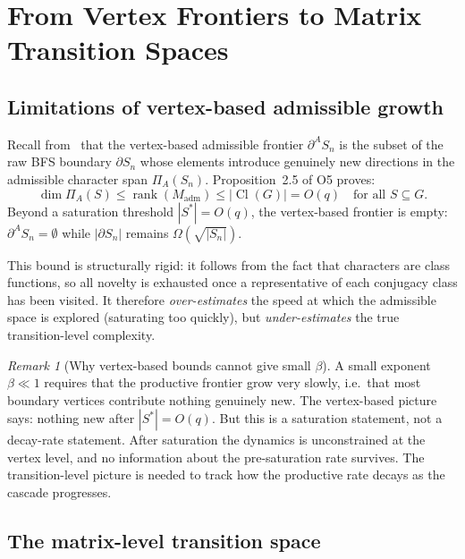 \documentclass[11pt]{article}
\theoremstyle{definition}
\theoremstyle{remark}
\newtheorem{remark}[theorem]{Remark}
\DeclareMathOperator{\rank}{rank}
\DeclareMathOperator{\Cl}{Cl}
\begin{document}
  \section{From Vertex Frontiers to Matrix Transition Spaces}
  \label{sec:matspace}

  \subsection{Limitations of vertex-based admissible growth}
    \label{ssec:vertex-limits}

    Recall from~\cite{Beau2026a9} that the vertex-based admissible frontier
    $\partial^A S_n$ is the subset of the raw BFS boundary $\partial S_n$ whose elements
    introduce genuinely new directions in the admissible character span $\Pi_A(S_n)$.
    Proposition~2.5 of O5 proves:
    \begin{equation}
      \label{eq:O5-saturation}
      \dim \Pi_A(S) \leq \rank(M_{\mathrm{adm}}) \leq |\Cl(G)| = O(q)
      \quad \text{for all } S \subseteq G.
    \end{equation}
    Beyond a saturation threshold $|S^*| = O(q)$, the vertex-based frontier is empty:
    $\partial^A S_n = \emptyset$ while $|\partial S_n|$ remains $\Omega(\sqrt{|S_n|})$.

    This bound is structurally rigid: it follows from the fact that characters are class
    functions, so all novelty is exhausted once a representative of each conjugacy class
    has been visited.
    It therefore \emph{over-estimates} the speed at which the admissible space is
    explored (saturating too quickly), but \emph{under-estimates} the true
    transition-level complexity.

    \begin{remark}[Why vertex-based bounds cannot give small $\beta$]
      \label{rem:vertex-failure}
      A small exponent $\beta \ll 1$ requires that the productive frontier grow very
      slowly, i.e.\ that most boundary vertices contribute nothing genuinely new.
      The vertex-based picture says: nothing new after $|S^*| = O(q)$.
      But this is a saturation statement, not a decay-rate statement.
      After saturation the dynamics is unconstrained at the vertex level, and no
      information about the pre-saturation rate survives.
      The transition-level picture is needed to track how the productive rate decays
      as the cascade progresses.
    \end{remark}

  \subsection{The matrix-level transition space}
    \label{ssec:matspace-def}
\end{document}
